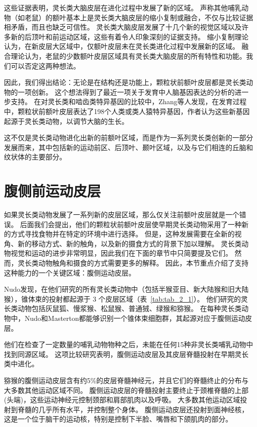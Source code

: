 这些证据表明，灵长类大脑皮层在进化过程中发展了新的区域。
声称其他哺乳动物（如老鼠）的额叶基本上是灵长类大脑皮层的缩小复制或融合，不仅与比较证据相矛盾，而且也缺乏可信性。
灵长类大脑皮层发展了十几个新的视觉区域以及许多新的后顶叶和前运动区域，这些有着令人印象深刻的证据支持。
缩小复制理论认为，在新皮层大区域中，仅额叶皮层未在灵长类进化过程中发展新的区域。
融合理论认为，老鼠的少数额叶皮层区域具有灵长类大脑皮层的所有特性和功能。我们可以否定这两种想法。


因此，我们得出结论：无论是在结构还是功能上，颗粒状前额叶皮层都是灵长类动物的一项创新。
这个想法得到了最近一项关于发育中人脑基因表达的分析的进一步支持。
在对灵长类和啮齿类特异基因的比较中，Zhang等人\cite{zhang2011accelerated}发现，在发育过程中，颗粒状前额叶皮层表达了198个人类或类人猿特异基因，作者认为这些新基因起源于灵长类动物，以调节大脑的生长。


这不仅是灵长类动物进化出新的前额叶区域，而是作为一系列灵长类创新的一部分发展而来，其中包括新的运动前区、后顶叶、颞叶区域，以及与它们相连的丘脑和纹状体的主要部分\cite{preuss2007evolutionary,preuss2007primate}。



\section{腹侧前运动皮层}

如果灵长类动物发展了一系列新的皮层区域，那么仅关注前额叶皮层就是一个错误。
后面我们会提出，他们的颗粒状前额叶皮层使早期灵长类动物采用了一种新的方式寻找食物并在特定的环境中进行选择。
但是，这种发展需要在全新的视角、新的移动方式、新的触角，以及新的摄食方式的背景下加以理解。
灵长类动物视觉和运动的进步非常明显，因此我们在下面的章节中只简要提及它们。
然而，灵长类动物触角和摄食的方式需要更多的解释。
因此，本节重点介绍了支持这种能力的一个关键区域：腹侧运动皮层。


Nudo\cite{nudo1988descending,nudo1990descending}发现，在他们研究的所有灵长类动物中（包括半猴亚目、新大陆猴和旧大陆猴），锥体束的投射都起源于 3 个皮层区域（表~\ref{tab:tab_2_1}）。
他们研究的灵长类动物包括灰鼠狐、慢浆猴、松鼠猴、普通狨、绿猴和猕猴。
在每种灵长类动物中，Nudo和Masterton都能够识别一个锥体束细胞群，其起源对应于腹侧运动皮层。


他们在检查了一定数量的哺乳动物物种之后，未能在任何15种非灵长类哺乳动物中找到同源区域。
这项比较研究表明，腹侧运动皮层及其皮层脊髓投射在早期灵长类中进化。


猕猴的腹侧运动皮层含有约5\%的皮层脊髓神经元\cite{dum2004motor}，并且它们的脊髓终止的分布与大多数其他运动区域不同。
腹侧运动皮层的脊髓投射主要终止于颈椎脊髓的上部(头端)，这些运动神经元控制颈部和肩部肌肉以及呼吸。
大多数其他运动区域投射到脊髓的几乎所有水平，并控制整个身体。
腹侧运动皮层还投射到面神经核，这是一个位于脑干的运动核，特别是控制下半脸、嘴唇和下颌肌肉的部分\cite{morecraft2001cortical}。


